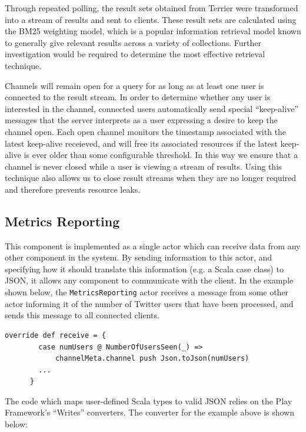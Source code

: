 \documentclass{l4proj}
\newcommand{\code}[1]{\texttt{#1}}
\begin{document}
        Through repeated polling, the result sets obtained from Terrier were transformed into a stream of results and sent to clients. These result sets are calculated using the BM25 weighting model, which is a popular information retrieval model known to generally give relevant results across a variety of collections. Further investigation would be required to determine the most effective retrieval technique.
        
        Channels will remain open for a query for as long as at least one user is connected to the result stream. In order to determine whether any user is interested in the channel, connected users automatically send special ``keep-alive'' messages that the server interprets as a user expressing a desire to keep the channel open. Each open channel monitors the timestamp associated with the latest keep-alive receieved, and will free its associated resources if the latest keep-alive is ever older than some configurable threshold. In this way we ensure that a channel is never closed while a user is viewing a stream of results. Using this technique also allows us to close result streams when they are no longer required and therefore prevents resource leaks.
        
     
        
    \subsection{Metrics Reporting}
    This component is implemented as a single actor which can receive data from any other component in the system. By sending information to this actor, and specifying how it should translate this information (e.g. a Scala case class) to JSON, it allows any component to communicate with the client. In the example shown below, the \code{MetricsReporting} actor receives a message from some other actor informing it of the number of Twitter users that have been processed, and sends this message to all connected clients.
    
    \begin{lstlisting}[caption=Forwarding new messages through the WebSocket to connected clients.]
      override def receive = {
        case numUsers @ NumberOfUsersSeen(_) => 
            channelMeta.channel push Json.toJson(numUsers)
        ...
      }
    \end{lstlisting}

The code which maps user-defined Scala types to valid JSON relies on the Play Framework's ``Writes'' converters. The converter for the example above is shown below:
\end{document}
